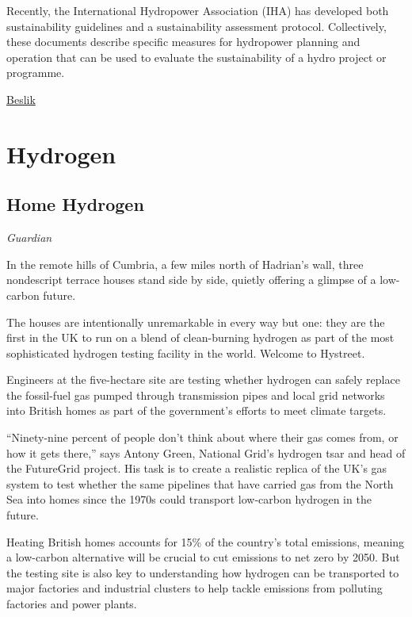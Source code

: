\documentclass[
]{book}
\begin{document}
Recently, the International Hydropower Association (IHA) has developed both sustainability guidelines and a sustainability assessment protocol. Collectively, these documents describe specific measures for hydropower planning and operation that can be used to evaluate the sustainability of a hydro project or programme.

\href{https://esgonasunday.substack.com/p/week-17-why-is-no-one-talking-about}{Beslik}

\hypertarget{hydrogen}{%
\chapter{Hydrogen}\label{hydrogen}}

\hypertarget{home-hydrogen}{%
\section{Home Hydrogen}\label{home-hydrogen}}

\emph{Guardian}

In the remote hills of Cumbria, a few miles north of Hadrian's wall, three nondescript terrace houses stand side by side, quietly offering a glimpse of a low-carbon future.

The houses are intentionally unremarkable in every way but one: they are the first in the UK to run on a blend of clean-burning hydrogen as part of the most sophisticated hydrogen testing facility in the world. Welcome to Hystreet.

Engineers at the five-hectare site are testing whether hydrogen can safely replace the fossil-fuel gas pumped through transmission pipes and local grid networks into British homes as part of the government's efforts to meet climate targets.

``Ninety-nine percent of people don't think about where their gas comes from, or how it gets there,'' says Antony Green, National Grid's hydrogen tsar and head of the FutureGrid project. His task is to create a realistic replica of the UK's gas system to test whether the same pipelines that have carried gas from the North Sea into homes since the 1970s could transport low-carbon hydrogen in the future.

Heating British homes accounts for 15\% of the country's total emissions, meaning a low-carbon alternative will be crucial to cut emissions to net zero by 2050. But the testing site is also key to understanding how hydrogen can be transported to major factories and industrial clusters to help tackle emissions from polluting factories and power plants.
\end{document}

